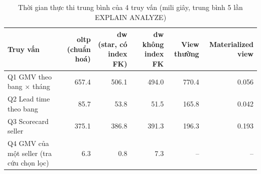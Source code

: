 \begin{table}[htbp]
\centering\small
\caption{Thời gian thực thi trung bình của 4 truy vấn (mili giây, trung bình 5 lần EXPLAIN ANALYZE)}
\label{tab:benchmark}
\begin{tabular}{p{4.6cm}rrrrr}
\toprule
\textbf{Truy vấn} & \textbf{oltp (chuẩn hoá)} & \textbf{dw (star, có index FK)} & \textbf{dw không index FK} & \textbf{View thường} & \textbf{Materialized view} \\
\midrule
Q1 GMV theo bang × tháng & 657.4 & 506.1 & 494.0 & 770.4 & 0.056 \\
Q2 Lead time theo bang & 85.7 & 53.8 & 51.5 & 165.8 & 0.042 \\
Q3 Scorecard seller & 375.1 & 386.8 & 391.3 & 196.3 & 0.193 \\
Q4 GMV của một seller (tra cứu chọn lọc) & 6.3 & 0.8 & 7.3 & -- & -- \\
\bottomrule
\end{tabular}
\end{table}
